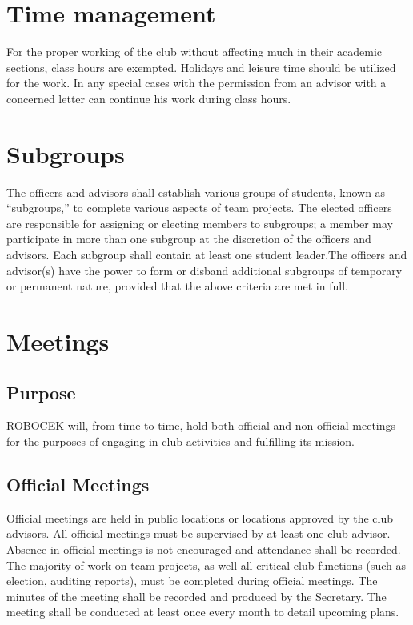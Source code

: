 \section{Time management}
For the proper working of the club without affecting much in their academic
sections, class hours are exempted. Holidays and leisure time should be utilized
for the work. In any special cases with the permission from an advisor with a
concerned letter can continue his work during class hours.

\section{Subgroups}
The officers and advisors shall establish various groups of students, known as
“subgroups,” to complete various aspects of team projects. The elected officers
are responsible for assigning or electing members to subgroups; a member may
participate in more than one subgroup at the discretion of the officers and
advisors. Each subgroup shall contain at least one student leader.The officers
and advisor(s) have the power to form or disband additional subgroups of
temporary or permanent nature, provided that the above criteria are met in full.


\section{Meetings}

\subsection{Purpose}
ROBOCEK will, from time to time, hold both official and non-official
meetings for the purposes of engaging in club activities and fulfilling its
mission.

\subsection{Official Meetings}
Official meetings are held in public locations or locations approved by the
club advisors. All official meetings must be supervised by at least one club
advisor. Absence in official meetings is not encouraged and attendance
shall be recorded. The majority of work on team projects, as well all critical
club functions (such as election, auditing reports), must be completed
during official meetings. The minutes of the meeting shall be recorded and
produced by the Secretary. The meeting shall be conducted at least once
every month to detail upcoming plans.

